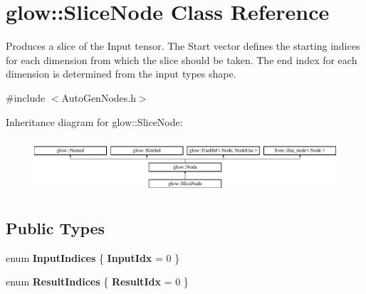 \hypertarget{classglow_1_1_slice_node}{}\section{glow\+:\+:Slice\+Node Class Reference}
\label{classglow_1_1_slice_node}


Produces a slice of the Input tensor. The Start vector defines the starting indices for each dimension from which the slice should be taken. The end index for each dimension is determined from the input type\textquotesingle{}s shape.  




{\ttfamily \#include $<$Auto\+Gen\+Nodes.\+h$>$}

Inheritance diagram for glow\+:\+:Slice\+Node\+:\begin{figure}[H]
\begin{center}
\leavevmode
\includegraphics[height=2.028986cm]{classglow_1_1_slice_node}
\end{center}
\end{figure}
\subsection*{Public Types}
\begin{DoxyCompactItemize}
\item 
\mbox{\label{classglow_1_1_slice_node_ae9fb67a3558af2956122b7987e0f13e0}} 
enum {\bfseries Input\+Indices} \{ {\bfseries Input\+Idx} = 0
 \}
\item 
\mbox{\label{classglow_1_1_slice_node_a76510ea2218d64abd2b0759fe9df2944}} 
enum {\bfseries Result\+Indices} \{ {\bfseries Result\+Idx} = 0
 \}
\end{DoxyCompactItemize}
